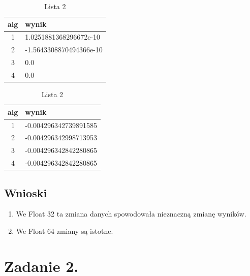 \documentclass[12pt]{article}
\begin{document}
\begin{table}[!htb]
    \caption{Porównanie wyników we Float 64}
    \begin{minipage}{.5\linewidth}
      \caption{Lista 1}
      \centering
      \begin{tabular}{|l|l|}
        \hline 
        \textbf{alg} & \textbf{wynik} \\
        \hline
        \ 1 & 1.0251881368296672e-10\\
        \hline
        \ 2 & -1.5643308870494366e-10\\
        \hline
        \ 3 & 0.0\\
        \hline
        \ 4 & 0.0\\
        \hline
    \end{tabular}
    \end{minipage}%
    \begin{minipage}{.5\linewidth}
      \centering
        \caption{Lista 2}
            \begin{tabular}{|l|l|}
                \hline 
                \textbf{alg} & \textbf{wynik} \\
                \hline
                \ 1 & -0.004296342739891585\\
                \hline
                \ 2 & -0.004296342998713953\\
                \hline
                \ 3 & -0.004296342842280865\\
                \hline
                \ 4 & -0.004296342842280865\\
                \hline
            \end{tabular} 
    \end{minipage} 
\end{table}

    
\subsection{Wnioski}
\begin{enumerate}
    \item We Float 32 ta zmiana danych spowodowała nieznaczną zmianę wyników.
    \item We Float 64 zmiany są istotne.
\end{enumerate}

\section{Zadanie 2.}
\end{document}
